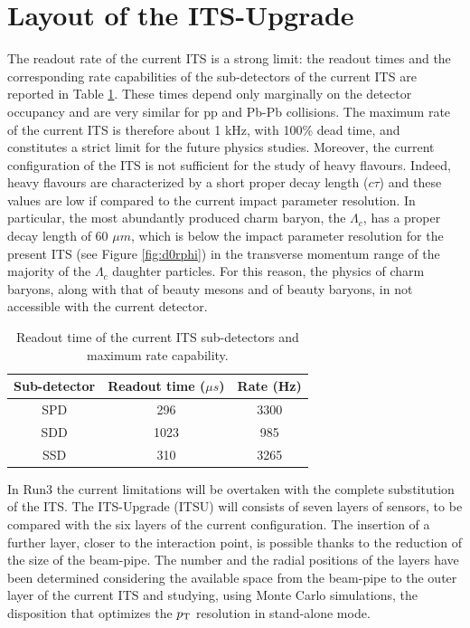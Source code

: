 \section{Layout of the ITS-Upgrade}
The readout rate of the current ITS is a strong limit: the readout times and the corresponding rate capabilities of the sub-detectors of the current ITS are reported in Table \ref{tab:curr}. These times depend only marginally on the detector occupancy and are very similar for pp and Pb-Pb collisions. The maximum rate of the current ITS is therefore about 1 kHz, with 100\% dead time, and constitutes a strict limit for the future physics studies. Moreover, the current configuration of the ITS is not sufficient for the study of heavy flavours. Indeed, heavy flavours are characterized by a short proper decay length ($c\tau$) and these values are low if compared to the current impact parameter resolution. In particular, the most abundantly produced charm baryon, the $\Lambda_{c}$, has a proper decay length of 60 $\mu m$, which is below the impact parameter resolution for the present ITS (see Figure \ref{fig:d0rphi}) in the transverse momentum range of the majority of the $\Lambda_{c}$ daughter particles. For this reason, the physics of charm baryons, along with that of beauty mesons and of beauty baryons, in not accessible with the current detector.\\
%
\begin{table}
\centering
\renewcommand\arraystretch{1.5}
 \begin{tabular}{|c|c|c|}
  \hline
  Sub-detector & Readout time ($\mu s$) & Rate (Hz)\\
  \hline
  SPD & 296 & 3300 \\
  SDD & 1023 & 985 \\
  SSD & 310 & 3265 \\
  \hline
 \end{tabular}
 \caption{Readout time of the current ITS sub-detectors and maximum rate capability.}
 \label{tab:curr}
\end{table}
%
In Run3 the current limitations will be overtaken with the complete substitution of the ITS. The ITS-Upgrade (ITSU) will consists of seven layers of sensors, to be compared with the six layers of the current configuration. The insertion of a further layer, closer to the interaction point, is possible thanks to the reduction of the size of the beam-pipe. The number and the radial positions of the layers have been determined considering the available space from the beam-pipe to the outer layer of the current ITS and studying, using Monte Carlo simulations, the disposition that optimizes the $p_\text{T}$ resolution in stand-alone mode.\\

